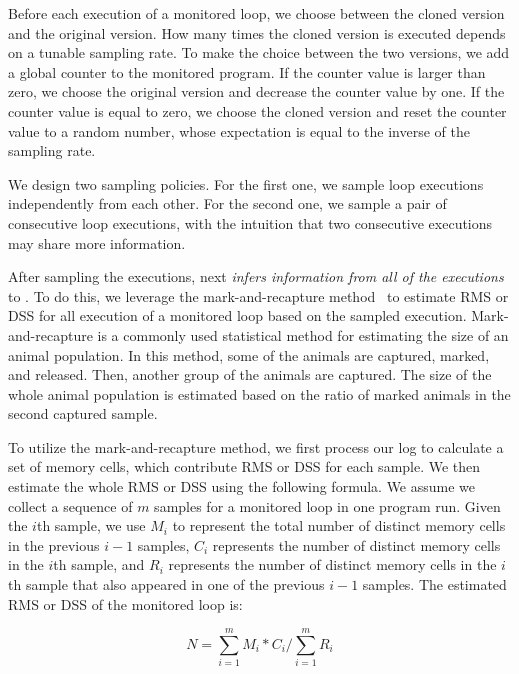 Before each execution of a monitored loop, 
we choose between the cloned version and the original version. 
How many times the cloned version is executed 
depends on a tunable sampling rate. 
To make the choice between the two versions,
we add a global counter to the monitored program. 
If the counter value is larger than zero, 
we choose the original version and decrease the counter value by one.
If the counter value is equal to zero,
we choose the cloned version and reset the counter value to 
a random number, 
whose expectation is 
equal to the inverse of the sampling rate.  

We design two sampling policies. 
For the first one, we sample loop executions independently from each other.
For the second one, we sample a pair of consecutive loop executions, 
with the intuition that two consecutive 
executions may share more information.


After sampling the executions, \Tool next \emph{infers information
from all of the executions} to .  
 To do this, we leverage the mark-and-recapture method~\cite{mark-recapture} to 
estimate RMS or DSS for all execution of a monitored loop 
based on the sampled execution. 
Mark-and-recapture is a commonly used statistical method 
for estimating the size of an animal population. 
In this method, some of the animals are captured, marked, and released. 
Then, another group of the animals are captured.
The size of the whole animal population is estimated 
based on the ratio of marked animals in the second captured sample.  

To utilize the mark-and-recapture method, 
we first process our log to calculate a set of memory cells, 
which contribute RMS
or DSS for each sample. 
We then estimate the whole RMS or DSS using the following formula.
We assume we collect a sequence of $m$ samples for a monitored loop 
in one program run.
Given the $i$th sample, we use $M_i$ to represent the 
total number of distinct memory cells in the previous $i-1$ samples, 
$C_i$ represents the number of distinct memory cells in the $i$th sample,
and $R_i$ represents the number of distinct memory cells in 
the $i$th sample that also appeared in one of the previous $i-1$ samples.
The estimated RMS or DSS of  the monitored loop is:

\begin{equation} \label{eq:mark}
N = \sum\limits_{i=1}^m M_i*C_i\Big/\sum\limits_{i=1}^m R_i
\end{equation}

